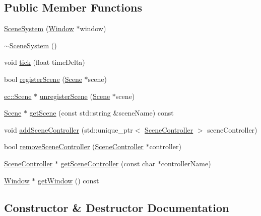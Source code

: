 \subsection*{Public Member Functions}
\begin{DoxyCompactItemize}
\item 
\mbox{\hyperlink{classec_1_1_scene_system_aa5a44baf7e80b2d7d0d96a84847bf2b6}{Scene\+System}} (\mbox{\hyperlink{classec_1_1_window}{Window}} $\ast$window)
\item 
\mbox{\hyperlink{classec_1_1_scene_system_a612e6cc45dbea62c7ffa4c752f965482}{$\sim$\+Scene\+System}} ()
\item 
void \mbox{\hyperlink{classec_1_1_scene_system_a5a858b4c58f53b04d7796e364351b825}{tick}} (float time\+Delta)
\item 
bool \mbox{\hyperlink{classec_1_1_scene_system_a192ef0c17aaa7893a6b2491ef557cfb6}{register\+Scene}} (\mbox{\hyperlink{classec_1_1_scene}{Scene}} $\ast$scene)
\item 
\mbox{\hyperlink{classec_1_1_scene}{ec\+::\+Scene}} $\ast$ \mbox{\hyperlink{classec_1_1_scene_system_ae00450951bc3220dd9899d75bdd207c4}{unregister\+Scene}} (\mbox{\hyperlink{classec_1_1_scene}{Scene}} $\ast$scene)
\item 
\mbox{\hyperlink{classec_1_1_scene}{Scene}} $\ast$ \mbox{\hyperlink{classec_1_1_scene_system_a25b2df199ddab1abc0e2e3f2c87bb690}{get\+Scene}} (const std\+::string \&scene\+Name) const
\item 
void \mbox{\hyperlink{classec_1_1_scene_system_a6f59921ccb0a64ead95efc6ef34ffac1}{add\+Scene\+Controller}} (std\+::unique\+\_\+ptr$<$ \mbox{\hyperlink{classec_1_1_scene_controller}{Scene\+Controller}} $>$ scene\+Controller)
\item 
bool \mbox{\hyperlink{classec_1_1_scene_system_ad15260128496d698ad43c2632e2dc7b4}{remove\+Scene\+Controller}} (\mbox{\hyperlink{classec_1_1_scene_controller}{Scene\+Controller}} $\ast$controller)
\item 
\mbox{\hyperlink{classec_1_1_scene_controller}{Scene\+Controller}} $\ast$ \mbox{\hyperlink{classec_1_1_scene_system_a0f897d342ba9a7ed8a06a478e6834c6c}{get\+Scene\+Controller}} (const char $\ast$controller\+Name)
\item 
\mbox{\hyperlink{classec_1_1_window}{Window}} $\ast$ \mbox{\hyperlink{classec_1_1_scene_system_afc687c570e4c1b83a85bf2bd69fa86eb}{get\+Window}} () const
\end{DoxyCompactItemize}


\subsection{Constructor \& Destructor Documentation}
\mbox{\label{classec_1_1_scene_system_aa5a44baf7e80b2d7d0d96a84847bf2b6}} 
